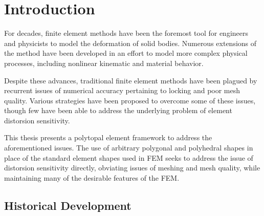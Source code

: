 \chapter{Introduction}


	For decades, finite element methods have been the foremost tool for engineers and physicists to model the deformation of solid bodies. Numerous extensions of the method have been developed in an effort to model more complex physical processes, including nonlinear kinematic and material behavior.

	Despite these advances, traditional finite element methods have been plagued by recurrent issues of numerical accuracy pertaining to locking and poor mesh quality. Various strategies have been proposed to overcome some of these issues, though few have been able to address the underlying problem of element distorsion sensitivity.

	This thesis presents a polytopal element framework to address the aforementioned issues. The use of arbitrary polygonal and polyhedral shapes in place of the standard element shapes used in FEM seeks to address the issue of distorsion sensitivity directly, obviating issues of meshing and mesh quality, while maintaining many of the desirable features of the FEM.

\section{Historical Development} %

